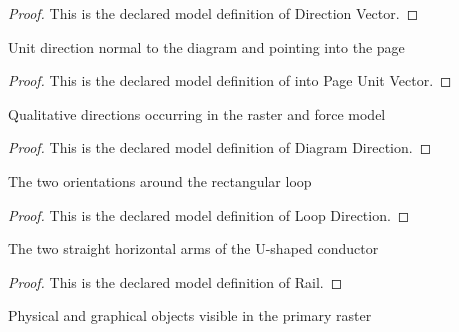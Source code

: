 \begin{proof}
  This is the declared model definition of Direction Vector.
\end{proof}
\begin{definition}
  \label{def:physics:phyx-mini-0977:phyxminiproblems-problemphyxmini0977-intopageunitvector}
  Unit direction normal to the diagram and pointing into the page
\end{definition}
\begin{proof}
  This is the declared model definition of into Page Unit Vector.
\end{proof}
\begin{definition}
  \label{def:physics:phyx-mini-0977:phyxminiproblems-problemphyxmini0977-diagramdirection}
  Qualitative directions occurring in the raster and force model
\end{definition}
\begin{proof}
  This is the declared model definition of Diagram Direction.
\end{proof}
\begin{definition}
  \label{def:physics:phyx-mini-0977:phyxminiproblems-problemphyxmini0977-loopdirection}
  The two orientations around the rectangular loop
\end{definition}
\begin{proof}
  This is the declared model definition of Loop Direction.
\end{proof}
\begin{definition}[Rail]
  \label{def:physics:phyx-mini-0977:phyxminiproblems-problemphyxmini0977-rail}
  The two straight horizontal arms of the U-shaped conductor
\end{definition}
\begin{proof}
  This is the declared model definition of Rail.
\end{proof}
\begin{definition}
  \label{def:physics:phyx-mini-0977:phyxminiproblems-problemphyxmini0977-figureobject}
  Physical and graphical objects visible in the primary raster
\end{definition}
